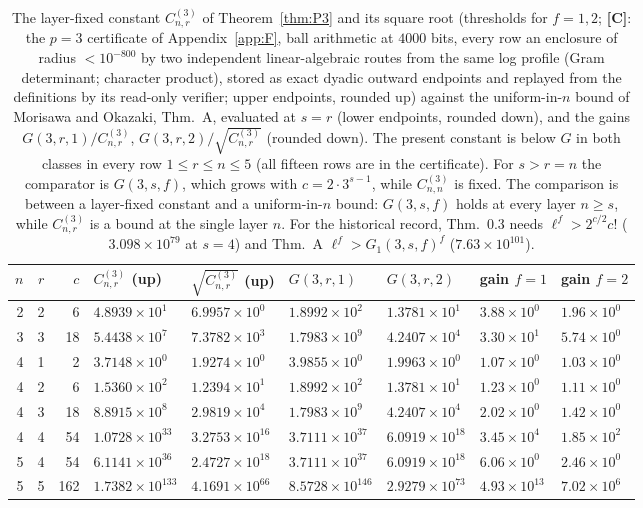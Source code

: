 \documentclass[11pt]{amsart}
\theoremstyle{remark}\newtheorem{remark}[theorem]{Remark}
\theoremstyle{definition}\newtheorem{definition}[theorem]{Definition}
\theoremstyle{definition}\newtheorem{algorithm}[theorem]{Algorithm}
\newcommand{\lbl}[1]{\textbf{[#1]}}\newcommand{\barT}{\bar T_n}
\begin{document}
\begin{table}[h]\scriptsize\centering\setlength{\tabcolsep}{3pt}
\begin{tabular}{@{}rrrllllll@{}}\toprule
$n$ & $r$ & $c$ & $C^{(3)}_{n,r}$ (up) & $\sqrt{C^{(3)}_{n,r}}$ (up) & $G(3,r,1)$ \cite{MO16} & $G(3,r,2)$ \cite{MO16} & gain $f{=}1$ & gain $f{=}2$\\ \midrule
2 & 2 & 6 & $4.8939\times10^{1}$ & $6.9957\times10^{0}$ & $1.8992\times10^{2}$ & $1.3781\times10^{1}$ & $3.88\times10^{0}$ & $1.96\times10^{0}$\\
3 & 3 & 18 & $5.4438\times10^{7}$ & $7.3782\times10^{3}$ & $1.7983\times10^{9}$ & $4.2407\times10^{4}$ & $3.30\times10^{1}$ & $5.74\times10^{0}$\\
4 & 1 & 2 & $3.7148\times10^{0}$ & $1.9274\times10^{0}$ & $3.9855\times10^{0}$ & $1.9963\times10^{0}$ & $1.07\times10^{0}$ & $1.03\times10^{0}$\\
4 & 2 & 6 & $1.5360\times10^{2}$ & $1.2394\times10^{1}$ & $1.8992\times10^{2}$ & $1.3781\times10^{1}$ & $1.23\times10^{0}$ & $1.11\times10^{0}$\\
4 & 3 & 18 & $8.8915\times10^{8}$ & $2.9819\times10^{4}$ & $1.7983\times10^{9}$ & $4.2407\times10^{4}$ & $2.02\times10^{0}$ & $1.42\times10^{0}$\\
4 & 4 & 54 & $1.0728\times10^{33}$ & $3.2753\times10^{16}$ & $3.7111\times10^{37}$ & $6.0919\times10^{18}$ & $3.45\times10^{4}$ & $1.85\times10^{2}$\\
5 & 4 & 54 & $6.1141\times10^{36}$ & $2.4727\times10^{18}$ & $3.7111\times10^{37}$ & $6.0919\times10^{18}$ & $6.06\times10^{0}$ & $2.46\times10^{0}$\\
5 & 5 & 162 & $1.7382\times10^{133}$ & $4.1691\times10^{66}$ & $8.5728\times10^{146}$ & $2.9279\times10^{73}$ & $4.93\times10^{13}$ & $7.02\times10^{6}$\\
\bottomrule\end{tabular}
\caption{The layer-fixed constant $C^{(3)}_{n,r}$ of Theorem~\ref{thm:P3} and its square root (thresholds for $f=1,2$; \lbl{C}: the $p=3$ certificate of Appendix~\ref{app:F}, ball arithmetic at $4000$ bits, every row an enclosure of radius $<10^{-800}$ by two independent linear-algebraic routes from the same log profile (Gram determinant; character product), stored as exact dyadic outward endpoints and replayed from the definitions by its read-only verifier; upper endpoints, rounded up) against the uniform-in-$n$ bound of Morisawa and Okazaki, \cite{MO16} Thm.~A, evaluated at $s=r$ (lower endpoints, rounded down), and the gains $G(3,r,1)/C^{(3)}_{n,r}$, $G(3,r,2)/\sqrt{C^{(3)}_{n,r}}$ (rounded down). The present constant is below $G$ in both classes in every row $1\le r\le n\le5$ (all fifteen rows are in the certificate). For $s>r=n$ the comparator is $G(3,s,f)$, which grows with $c=2\cdot3^{s-1}$, while $C^{(3)}_{n,n}$ is fixed. The comparison is between a layer-fixed constant and a uniform-in-$n$ bound: $G(3,s,f)$ holds at every layer $n\ge s$, while $C^{(3)}_{n,r}$ is a bound at the single layer $n$. For the historical record, \cite{MO13} Thm.~0.3 needs $\ell^f>2^{c/2}c!$ ($3.098\times10^{79}$ at $s=4$) and \cite{MO13} Thm.~A $\ell^f>G_1(3,s,f)^f$ ($7.63\times10^{101}$).}\label{tab:p3}
\end{table}
\end{document}
